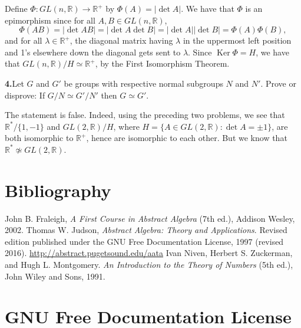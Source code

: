\documentclass[10pt,]{book}
\theoremstyle{plain}
\theoremstyle{definition}
\theoremstyle{definition}
\theoremstyle{definition}
\theoremstyle{definition}
\numberwithin{equation}{section}
\def\R{\mathbb{R}}
\DeclareMathOperator{\Ker}{Ker}
\begin{document}
\par\smallskip
Define \(\Phi:GL(n,\R)\to \R^+\) by \(\Phi(A)=|\det A|\). We have that \(\Phi\) is an epimorphism since for all \(A,B\in GL(n,\R)\),%
\begin{equation*}
\Phi(AB)=|\det AB|=|\det A \det B|=|\det
A||\det B|=\Phi(A)\Phi(B),
\end{equation*}
and for all \(\lambda \in \R^+\), the diagonal matrix having \(\lambda\) in the uppermost left position and 1's elsewhere down the diagonal gets sent to \(\lambda\). Since \(\Ker
\Phi=H\), we have that \(GL(n,\R)/H \simeq \R^+\), by the First Isomorphism Theorem.%
\par\smallskip
\noindent\textbf{4.}\quad{}Let \(G\) and \(G'\) be groups with respective normal subgroups \(N\) and \(N'\). Prove or disprove: If \(G/N\simeq G'/N'\) then \(G\simeq
G'\).%
\par\smallskip
The statement is false. Indeed, using the preceding two problems, we see that \(\R^*/\{1,-1\}\) and \(GL(2,\R)/H\), where \(H=\{A\in GL(2,\R):\det A =\pm 1\}\), are both isomorphic to \(\R^+\), hence are isomorphic to each other. But we know that \(\R^* \not\simeq GL(2,\R)\).%
\par\smallskip
\typeout{************************************************}
\typeout{************************************************}
\chapter[{Bibliography}]{Bibliography}\label{references-1}
\begin{referencelist}
\hypertarget{F}{}John B. Fraleigh, \textit{A First Course in Abstract Algebra} (7th ed.), Addison Wesley, 2002.
\hypertarget{J}{}Thomas W. Judson, \textit{Abstract Algebra: Theory and Applications}. Revised edition published under the GNU Free Documentation License, 1997 (revised 2016). \href{http://abstract.pugetsound.edu/aata}{http://abstract.pugetsound.edu/aata}
\hypertarget{NZM}{}Ivan Niven, Herbert S. Zuckerman, and Hugh L. Montgomery. \textit{An Introduction to the Theory of Numbers} (5th ed.), John Wiley and Sons, 1991.
\end{referencelist}
\typeout{************************************************}
\typeout{************************************************}
\chapter[{GNU Free Documentation License}]{GNU Free Documentation License}\label{appendix-gfdl}
\typeout{************************************************}
\typeout{************************************************}
\end{document}
